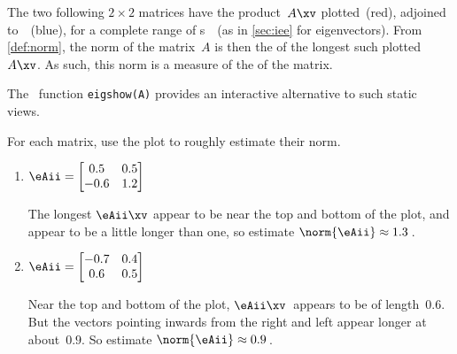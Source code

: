 \begin{example} \label{eg:}
The two following \(2\times2\) matrices have the product~\(A\xv\) plotted~(red), adjoined to~\xv~(blue), for a complete range of s~\xv\ (as in \autoref{sec:iee} for eigenvectors).
From \autoref{def:norm}, the norm of the matrix~\(A\) is then the  of the longest such plotted~\(A\xv\).
As such, this norm is a measure of the  of the matrix.
\begin{aside}
The \script[1]\ function \texttt{eigshow(A)} provides an interactive alternative to such static views.
\end{aside}%
For each matrix, use the plot to roughly estimate their norm.
\begin{enumerate}
\item\label{eg:g2x2norm:a} \(\eAii=\begin{bmatrix} 0.5&0.5\\-0.6&1.2 \end{bmatrix}\)\\
\begin{solution} 
The longest \(\eAii\xv\) appear to be near the top and bottom of the plot, and appear to be a little longer than one, so estimate \(\norm{\eAii}\approx 1.3\)\,.
\end{solution}

\item \(\eAii=\begin{bmatrix} {-0.7}&{0.4}\\{0.6}&{0.5} \end{bmatrix}\)\\
\begin{solution} 
Near the top and bottom of the plot, \(\eAii\xv\)~appears to be of length~\(0.6\).   
But the vectors pointing inwards from the right and left appear  longer at about~\(0.9\). 
So estimate \(\norm{\eAii}\approx 0.9\)\,.
\end{solution}

\end{enumerate}
\end{example}




